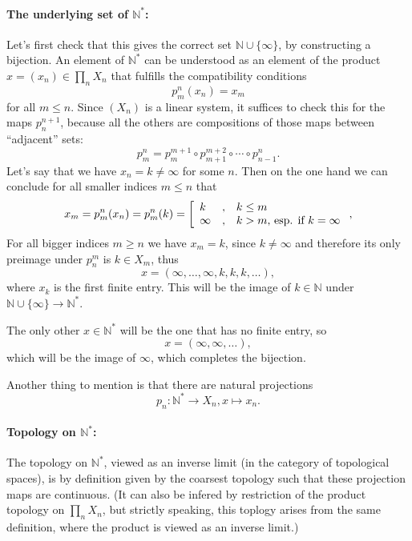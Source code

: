 \documentclass{notes}
\begin{document}
{\paragraph{The underlying set of $\mathbb N^*$:}
Let's first check that this gives the correct set $\mathbb N \cup \{\infty\}$, by constructing a bijection.
An element of $\mathbb N^*$ can be understood as an element of the product $x = (x_n) \in \prod_n X_n$ that fulfills the compatibility conditions
  \[
    p^n_m(x_n) = x_m
  \]
  for all $m \leq n$.
Since $(X_n)$ is a linear system, it suffices to check this for the maps $p^{n+1}_n$, because all the others are compositions of those maps between ``adjacent'' sets:
  \[
    p^n_m = p^{m+1}_m \circ p^{m+2}_{m+1} \circ \cdots \circ p^n_{n-1}.
  \]
  Let's say that we have $x_n = k \neq \infty$ for some $n$.
Then on the one hand we can conclude for all smaller indices $m \leq n$ that
  \[
    x_m = p^n_m(x_n) = p^n_m(k) =
    \left[
    \begin{array}{lll}
      k
      & ,
      & k \leq m
      \\  \infty
      & ,
      & \textup{$k > m$, esp. if  $k = \infty$}
    \end{array}
    \right.,
  \]
  For all bigger indices $m \geq n$ we have $x_m = k$, since $k \neq \infty$ and therefore its only preimage under $p^m_n$ is $k \in X_m$, thus
  \[
    x = (\infty, \dots, \infty, k, k, k, \dots),
  \]
  where $x_k$ is the first finite entry.
This will be the image of $k \in \mathbb N$ under $\mathbb N \cup \{\infty\} \longrightarrow \mathbb N^*$.

The only other $x \in \mathbb N^*$ will be the one that has no finite entry, so
  \[
    x = (\infty, \infty, \dots),
  \]
  which will be the image of $\infty$, which completes the bijection.

Another thing to mention is that there are natural projections
  \[
    p_n \colon \mathbb N^* \longrightarrow X_n, x \longmapsto x_n.
  \]


  \paragraph{Topology on $\mathbb N^*$:}

  The topology on $\mathbb N^*$, viewed as an inverse limit (in the category of topological spaces), is by definition given by the coarsest topology such that these projection maps are continuous.
  (It can also be infered by restriction of the product topology on $\prod_n X_n$, but strictly speaking, this toplogy arises from the same definition, where the product is viewed as an inverse limit.)

}
\end{document}
